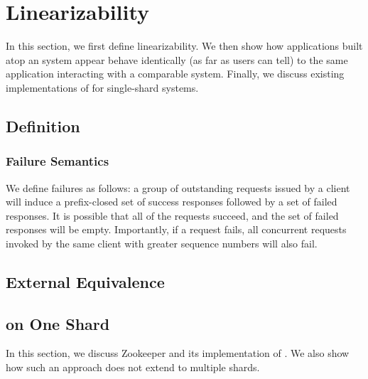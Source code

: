 \section{\Multidispatch{} Linearizability}
\label{sec:mdl}

In this section, we first define \multidispatch{} linearizability. 
We then show how applications built atop an \MDL{} system appear behave
identically (as far as users can tell) to the same application interacting
with a comparable \SDL{} system. Finally, we discuss existing implementations
of \SDL{} for single-shard systems. 

\subsection{Definition}
\label{sec:mdl:def}

\subsubsection{Failure Semantics}

We define \mdl failures as follows: a group of outstanding requests issued by a client will induce a prefix-closed set of success responses followed by a set of failed responses. It is possible that all of the requests succeed, and the set of failed responses will be empty. Importantly, if a request fails, all concurrent requests invoked by the same client with greater sequence numbers will also fail.

\subsection{External Equivalence}
\label{sec:mdl:equivalence}

\subsection{\MDL{} on One Shard}
\label{sec:mdl:single-shard}

In this section, we discuss Zookeeper and its implementation of \SDL{}.
We also show how such an approach does not extend to multiple shards.

